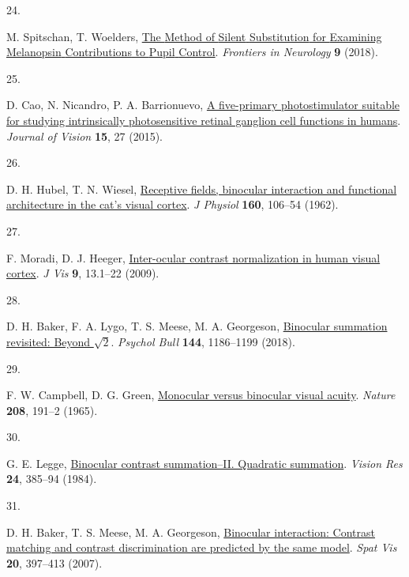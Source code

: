 \documentclass[
]{article}
\newlength{\cslhangindent}
\newlength{\csllabelwidth}
\newlength{\cslentryspacingunit} %
\newenvironment{CSLReferences}[2] %
 {%
  \setlength{\parindent}{0pt}
  \ifodd #1
  \let\oldpar\par
  \def\par{\hangindent=\cslhangindent\oldpar}
  \fi
  \setlength{\parskip}{#2\cslentryspacingunit}
 }%
 {}
\newcommand{\CSLLeftMargin}[1]{\parbox[t]{\csllabelwidth}{#1}}
\newcommand{\CSLRightInline}[1]{\parbox[t]{\linewidth - \csllabelwidth}{#1}\break}
\begin{document}
\begin{CSLReferences}{0}{0}
\leavevmode{}%
\CSLLeftMargin{24. }%
\CSLRightInline{M. Spitschan, T. Woelders, \href{https://doi.org/10.3389/fneur.2018.00941}{The {Method} of {Silent} {Substitution} for {Examining} {Melanopsin} {Contributions} to {Pupil} {Control}}. \emph{Frontiers in Neurology} \textbf{9} (2018).}

\leavevmode{}%
\CSLLeftMargin{25. }%
\CSLRightInline{D. Cao, N. Nicandro, P. A. Barrionuevo, \href{https://doi.org/10.1167/15.1.27}{A five-primary photostimulator suitable for studying intrinsically photosensitive retinal ganglion cell functions in humans}. \emph{Journal of Vision} \textbf{15}, 27 (2015).}

\leavevmode{}%
\CSLLeftMargin{26. }%
\CSLRightInline{D. H. Hubel, T. N. Wiesel, \href{https://doi.org/10.1113/jphysiol.1962.sp006837}{Receptive fields, binocular interaction and functional architecture in the cat's visual cortex}. \emph{J Physiol} \textbf{160}, 106--54 (1962).}

\leavevmode{}%
\CSLLeftMargin{27. }%
\CSLRightInline{F. Moradi, D. J. Heeger, \href{https://doi.org/10.1167/9.3.13}{Inter-ocular contrast normalization in human visual cortex}. \emph{J Vis} \textbf{9}, 13.1--22 (2009).}

\leavevmode{}%
\CSLLeftMargin{28. }%
\CSLRightInline{D. H. Baker, F. A. Lygo, T. S. Meese, M. A. Georgeson, \href{https://doi.org/10.1037/bul0000163}{Binocular summation revisited: Beyond \(\sqrt{2}\)}. \emph{Psychol Bull} \textbf{144}, 1186--1199 (2018).}

\leavevmode{}%
\CSLLeftMargin{29. }%
\CSLRightInline{F. W. Campbell, D. G. Green, \href{https://doi.org/10.1038/208191a0}{Monocular versus binocular visual acuity}. \emph{Nature} \textbf{208}, 191--2 (1965).}

\leavevmode{}%
\CSLLeftMargin{30. }%
\CSLRightInline{G. E. Legge, \href{https://doi.org/10.1016/0042-6989(84)90064-6}{Binocular contrast summation--II. Quadratic summation}. \emph{Vision Res} \textbf{24}, 385--94 (1984).}

\leavevmode{}%
\CSLLeftMargin{31. }%
\CSLRightInline{D. H. Baker, T. S. Meese, M. A. Georgeson, \href{https://doi.org/10.1163/156856807781503622}{Binocular interaction: Contrast matching and contrast discrimination are predicted by the same model}. \emph{Spat Vis} \textbf{20}, 397--413 (2007).}


\end{CSLReferences}
\end{document}
